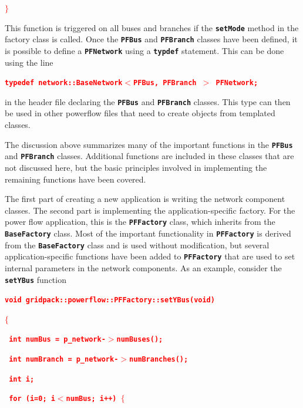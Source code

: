\documentclass[12pt]{report} %
\begin{document}
\textcolor{red}{\texttt{\textbf{$\boldsymbol{\mathrm{\}}}$}}}

This function is triggered on all buses and branches if the \texttt{\textbf{setMode}} method in the factory class is called.
Once the \texttt{\textbf{PFBus}} and \texttt{\textbf{PFBranch}} classes have been defined, it is possible to define a \texttt{\textbf{PFNetwork}} using a \texttt{\textbf{typdef}} statement. This can be done using the line

\textcolor{red}{\texttt{\textbf{typedef network::BaseNetwork$\boldsymbol{\mathrm{<}}$PFBus, PFBranch $\boldsymbol{\mathrm{>}}$ PFNetwork;}}}

in the header file declaring the \texttt{\textbf{PFBus}} and \texttt{\textbf{PFBranch}} classes. This type can then be used in other powerflow files that need to create objects from templated classes.

The discussion above summarizes many of the important functions in the \texttt{\textbf{PFBus}} and \texttt{\textbf{PFBranch}} classes. Additional functions are included in these classes that are not discussed here, but the basic principles involved in implementing the remaining functions have been covered. 

The first part of creating a new application is writing the network component classes. The second part is implementing the application-specific factory. For the power flow application, this is the \texttt{\textbf{PFFactory}} class, which inherits from the \texttt{\textbf{BaseFactory}} class. Most of the important functionality in \texttt{\textbf{PFFactory}} is derived from the \texttt{\textbf{BaseFactory}} class and is used without modification, but several application-specific functions have been added to \texttt{\textbf{PFFactory}} that are used to set internal parameters in the network components. As an example, consider the \texttt{\textbf{setYBus}} function

\textcolor{red}{\texttt{\textbf{void gridpack::powerflow::PFFactory::setYBus(void)}}}

\textcolor{red}{\texttt{\textbf{$\boldsymbol{\mathrm{\{}}$}}}

\textcolor{red}{\texttt{\textbf{  int numBus = p\_network-$\boldsymbol{\mathrm{>}}$numBuses();}}}

\textcolor{red}{\texttt{\textbf{  int numBranch = p\_network-$\boldsymbol{\mathrm{>}}$numBranches();}}}

\textcolor{red}{\texttt{\textbf{  int i;}}}

\textcolor{red}{\texttt{\textbf{  for (i=0; i$\boldsymbol{\mathrm{<}}$numBus; i++) $\boldsymbol{\mathrm{\{}}$}}}
\end{document}
